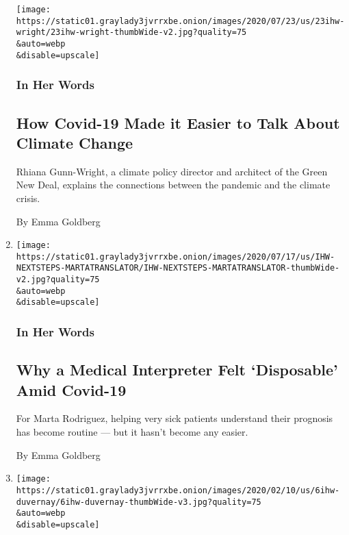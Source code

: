 \begin{enumerate}
  \texttt{[image: https://static01.graylady3jvrrxbe.onion/images/2020/07/23/us/23ihw-wright/23ihw-wright-thumbWide-v2.jpg?quality=75\\\&auto=webp\\\&disable=upscale]}

  \hypertarget{in-her-words-2}{%
  \subsubsection{In Her Words}\label{in-her-words-2}}

  \hypertarget{how-covid-19-made-it-easier-to-talk-about-climate-change}{%
  \subsection{How Covid-19 Made it Easier to Talk About Climate
  Change}\label{how-covid-19-made-it-easier-to-talk-about-climate-change}}

  Rhiana Gunn-Wright, a climate policy director and architect of the
  Green New Deal, explains the connections between the pandemic and the
  climate crisis.

  By Emma Goldberg
\item
  \href{/2020/07/20/us/medical-interpreter-covid-hospitals-coronavirus.html}{}

  \texttt{[image: https://static01.graylady3jvrrxbe.onion/images/2020/07/17/us/IHW-NEXTSTEPS-MARTATRANSLATOR/IHW-NEXTSTEPS-MARTATRANSLATOR-thumbWide-v2.jpg?quality=75\\\&auto=webp\\\&disable=upscale]}

  \hypertarget{in-her-words-3}{%
  \subsubsection{In Her Words}\label{in-her-words-3}}

  \hypertarget{why-a-medical-interpreter-felt-disposable-amid-covid-19}{%
  \subsection{Why a Medical Interpreter Felt `Disposable' Amid
  Covid-19}\label{why-a-medical-interpreter-felt-disposable-amid-covid-19}}

  For Marta Rodriguez, helping very sick patients understand their
  prognosis has become routine --- but it hasn't become any easier.

  By Emma Goldberg
\item
  \href{/2020/07/08/movies/director-ava-duvernay-movies-police-protests.html}{}

  \texttt{[image: https://static01.graylady3jvrrxbe.onion/images/2020/02/10/us/6ihw-duvernay/6ihw-duvernay-thumbWide-v3.jpg?quality=75\\\&auto=webp\\\&disable=upscale]}


\end{enumerate}
